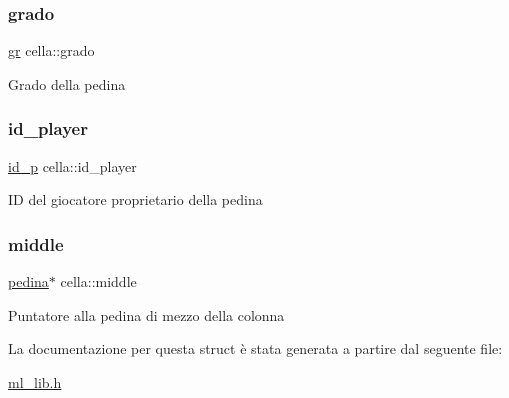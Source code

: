\subsubsection{\texorpdfstring{grado}{grado}}
{\footnotesize\ttfamily \hyperlink{ml__lib_8h_a25f6e8adc446355e3f42092ecf9d598c}{gr} cella\+::grado}

Grado della pedina \mbox{\label{structcella_a7cf7cebae17473f8d52d515a2a400dfe}} 
\subsubsection{\texorpdfstring{id\+\_\+player}{id\_player}}
{\footnotesize\ttfamily \hyperlink{ml__lib_8h_a0330ff92cbc796e96c3ce3e4401bf1e1}{id\+\_\+p} cella\+::id\+\_\+player}

ID del giocatore proprietario della pedina \mbox{\label{structcella_aee3fa6fae5c1685708b80a7dca8fafd7}} 
\subsubsection{\texorpdfstring{middle}{middle}}
{\footnotesize\ttfamily \hyperlink{ml__lib_8h_a71fee95122b31f5cb0b07d9c16ffa3a5}{pedina}$\ast$ cella\+::middle}

Puntatore alla pedina di mezzo della colonna 

La documentazione per questa struct è stata generata a partire dal seguente file\+:\begin{DoxyCompactItemize}
\item 
\hyperlink{ml__lib_8h}{ml\+\_\+lib.\+h}\end{DoxyCompactItemize}
